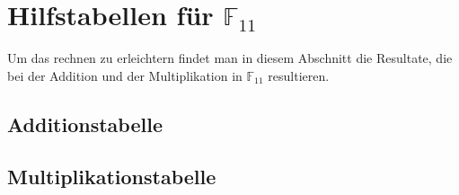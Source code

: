 %
%
%
\section{Hilfstabellen für $\mathbb{F}_{11}$
	\label{reedsolomon:section:hilfstabellen}}

Um das rechnen  zu erleichtern findet man in diesem Abschnitt die Resultate, die bei der Addition und der Multiplikation in $\mathbb{F}_{11}$ resultieren.

\subsection{Additionstabelle
	\label{reedsolomon:subsection:adtab}}	


\subsection{Multiplikationstabelle
	\label{reedsolomon:subsection:mptab}}
